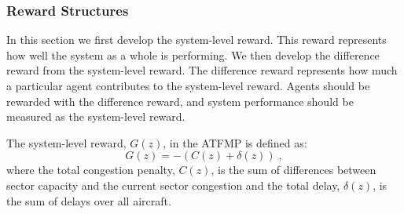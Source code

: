 \documentclass[smallcondensed]{svjour3}
\begin{document}

 

\subsubsection{Reward Structures}

In this section we first develop the system-level reward. This reward represents how well the system as a whole is performing. We then develop the difference reward from the system-level reward. The difference reward represents how much a particular agent contributes to the system-level reward. Agents should be rewarded with the difference reward, and system performance should be measured as the system-level reward. 

The system-level reward, $G(z)$, in the ATFMP is defined as:
%
\begin{equation} \label{eq:Global}
G(z) = -(C(z) + \delta(z))\;,
\end{equation}
where the total congestion penalty, $C(z)$, is the sum of differences between sector capacity and the current sector congestion and the total delay, $\delta(z)$, is the sum of delays over all aircraft.
\end{document}
